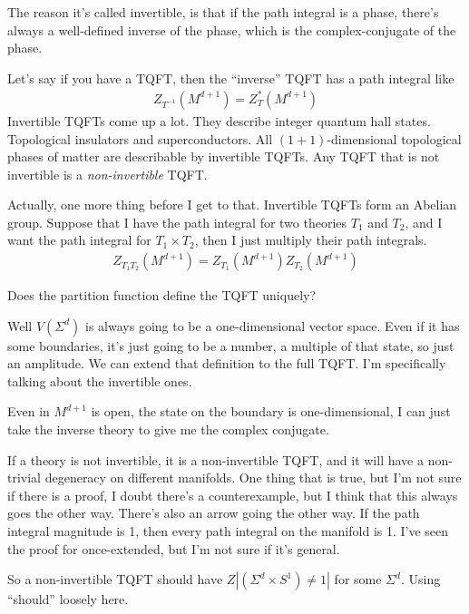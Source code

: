 The reason it's called invertible,
is that if the path integral is a phase,
there's always a well-defined inverse of the phase,
which is the complex-conjugate of the phase.

Let's say if you have a TQFT,
then the ``inverse'' TQFT has a path integral like
\begin{align}
    Z_{T^{-1}}\left( M^{d+1} \right)
    =
    Z_T^*\left( M^{d+1} \right)
\end{align}
Invertible TQFTs come up a lot.
They describe integer quantum hall states.
Topological insulators and superconductors.
All $(1+1)$-dimensional topological phases of matter are describable by
invertible TQFTs.
Any TQFT that is not invertible is a \emph{non-invertible} TQFT.


Actually, one more thing before I get to that.
Invertible TQFTs form an Abelian group.
Suppose that I have the path integral for two theories $T_1$ and $T_2$,
and I want the path integral for $T_1\times T_2$,
then I just multiply their path integrals.
\begin{align}
    Z_{T_1T_2}\left( M^{d+1} \right)
    =
    Z_{T_1}\left( M^{d+1} \right)
    Z_{T_2}\left( M^{d+1} \right)
\end{align}

\begin{question}
    Does the partition function define the TQFT uniquely?
\end{question}
Well $V(\Sigma^d)$ is always going to be a one-dimensional vector space.
Even if it has some boundaries,
it's just going to be a number,
a multiple of that state,
so just an amplitude.
We can extend that definition to the full TQFT.
I'm specifically talking about the invertible ones.

Even in $M^{d+1}$ is open,
the state on the boundary is one-dimensional,
I can just take the inverse theory to give me the complex conjugate.

If a theory is not invertible,
it is a non-invertible TQFT,
and it will have a non-trivial degeneracy on different manifolds.
One thing that is true,
but I'm not sure if there is a proof,
I doubt there's a counterexample,
but I think that this always goes the other way.
There's also an arrow going the other way.
If the path integral magnitude is 1,
then every path integral on the manifold is 1.
I've seen the proof for once-extended,
but I'm not sure if it's general.

So a non-invertible TQFT should have
$Z|\left( \Sigma^d\times S^1 \right)\ne 1|$
for some $\Sigma^d$.
Using ``should'' loosely here.


